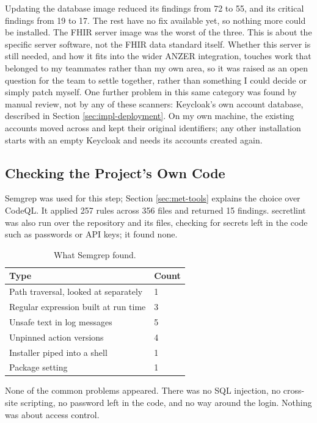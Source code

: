 Updating the database image reduced its findings from 72 to 55, and its critical findings from 19 to 17. The rest have no fix available yet, so nothing more could be installed. The FHIR server image was the worst of the three. This is about the specific server software, not the FHIR data standard itself. Whether this server is still needed, and how it fits into the wider ANZER integration, touches work that belonged to my teammates rather than my own area, so it was raised as an open question for the team to settle together, rather than something I could decide or simply patch myself. One further problem in this same category was found by manual review, not by any of these scanners: Keycloak's own account database, described in Section \ref{sec:impl-deployment}. On my own machine, the existing accounts moved across and kept their original identifiers; any other installation starts with an empty Keycloak and needs its accounts created again.

\subsection{Checking the Project's Own Code}

Semgrep was used for this step; Section \ref{sec:met-tools} explains the choice over CodeQL. It applied 257 rules across 356 files and returned 15 findings. secretlint was also run over the repository and its files, checking for secrets left in the code such as passwords or API keys; it found none.

\begin{table}[H]
\centering
\caption{What Semgrep found.}
\label{tab:semgrep}
\begin{tabular}{|p{12.4cm}|p{1.5cm}|}
\hline
\textbf{Type} & \textbf{Count} \\
\hline
Path traversal, looked at separately & 1 \\
\hline
Regular expression built at run time & 3 \\
\hline
Unsafe text in log messages & 5 \\
\hline
Unpinned action versions & 4 \\
\hline
Installer piped into a shell & 1 \\
\hline
Package setting & 1 \\
\hline
\end{tabular}
\end{table}

None of the common problems appeared. There was no SQL injection, no cross-site scripting, no password left in the code, and no way around the login. Nothing was about access control.

